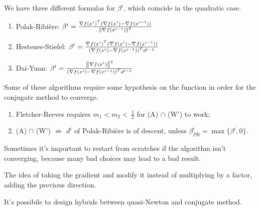 \documentclass[computational_mathematics.tex]{subfiles}
\begin{document}

We have three different formulas for $\beta^i$, which coincide in the quadratic case.

\begin{enumerate}
  \item Polak-Ribi\`ere: $\beta^i = \frac{\nabla {f(x^i)}^{T} (\nabla f(x^i) - \nabla f(x^{i-1}))}{{\left\lVert\nabla f(x^{i-1})\right\rVert}^2}$  
  \item Hestenes-Stiefel: $\beta^i = \frac{{\nabla f(x^i)}^{T}(\nabla f(x^i) - \nabla f(x^{i-1}))}{{(\nabla f(x^i) - \nabla f(x^{i-1}))}^{T}d^{i-1}}$
    
  \item Dai-Yuan: $\beta^i = \frac{{\left\lVert\nabla f(x^i)\right\rVert}^2}{{(\nabla f(x^i) - \nabla f(x^{i-1}))}^{T} d^{i-1}}$
\end{enumerate}

Some of these algorithms require some hypothesis on the function in order for the conjugate method to converge.

\begin{enumerate}
  \item Fletcher-Reeves requires $m_1 < m_2 < \, \frac{1}{2}$ for (A) $\cap$ (W') to work;
  \item (A) $\cap$ (W') $\not\Longrightarrow$ $d^i$ of Polak-Ribière is of descent, unless $\beta^i_{PR} = \max \{\beta^i, 0\}$.
\end{enumerate}

Sometimes it's important to restart from scratches if the algorithm isn't converging, because many bad choices may lead to a bad result.

The idea of taking the gradient and modify it instead of multiplying by a factor, adding the previous direction.

It's possibile to design hybrids between quasi-Newton and conjugate method.
\end{document}
